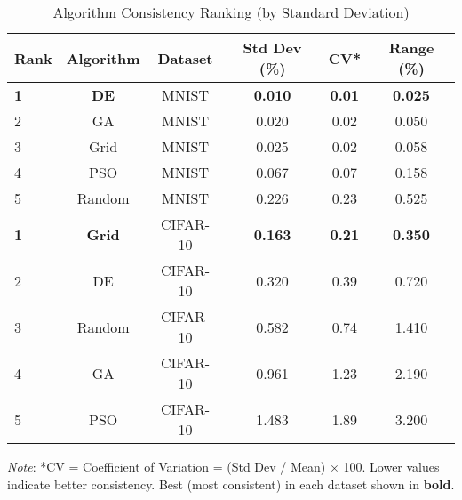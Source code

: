 \begin{table}[htbp]
\centering
\caption{Algorithm Consistency Ranking (by Standard Deviation)}
\label{tab:consistency_ranking}
\begin{tabular}{lccccc}
\toprule
\textbf{Rank} & \textbf{Algorithm} & \textbf{Dataset} & \textbf{Std Dev (\%)} & \textbf{CV*} & \textbf{Range (\%)} \\
\midrule
\textbf{1} & \textbf{DE} & MNIST & \textbf{0.010} & \textbf{0.01} & \textbf{0.025} \\
2 & GA & MNIST & 0.020 & 0.02 & 0.050 \\
3 & Grid & MNIST & 0.025 & 0.02 & 0.058 \\
4 & PSO & MNIST & 0.067 & 0.07 & 0.158 \\
5 & Random & MNIST & 0.226 & 0.23 & 0.525 \\
\midrule
\textbf{1} & \textbf{Grid} & CIFAR-10 & \textbf{0.163} & \textbf{0.21} & \textbf{0.350} \\
2 & DE & CIFAR-10 & 0.320 & 0.39 & 0.720 \\
3 & Random & CIFAR-10 & 0.582 & 0.74 & 1.410 \\
4 & GA & CIFAR-10 & 0.961 & 1.23 & 2.190 \\
5 & PSO & CIFAR-10 & 1.483 & 1.89 & 3.200 \\
\bottomrule
\end{tabular}
\vspace{2mm}
\begin{minipage}{\textwidth}
\small
\textit{Note}: *CV = Coefficient of Variation = (Std Dev / Mean) $\times$ 100. Lower values indicate better consistency. Best (most consistent) in each dataset shown in \textbf{bold}.
\end{minipage}
\end{table}
